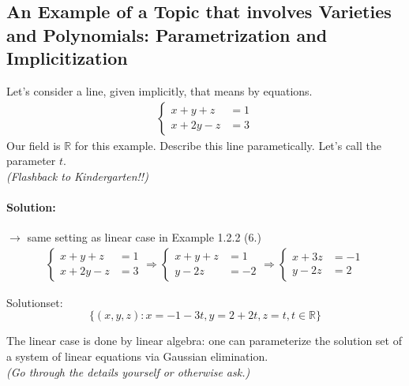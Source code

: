 \clearpage
\subsection{An Example of a Topic that involves Varieties and Polynomials: Parametrization and Implicitization} 

\begin{exercise}[title = Example 1.3.1 (Linear Case)]
  Let's consider a line, given implicitly, that means by equations. 
  \begin{align*}
  \left\{\begin{aligned}
    x + y + z & = 1 \\
    x + 2y -z & = 3
  \end{aligned}\right. 
\end{align*}
Our field is $\mathbb{R}$ for this example. Describe this line parametically. Let's call the parameter $t$.  \\ 

\hspace*{0.5cm}\textcolor{airforceblue}{\textit{(Flashback to Kindergarten!!)}} \\ 

\paragraph{Solution:} $\rightarrow$ same setting as linear case in Example 1.2.2 (6.)
\begin{align*}
  \left\{
  \begin{aligned}
    x + y + z & = 1 \\
    x + 2y -z & = 3
  \end{aligned} \right. \Longrightarrow
  \left\{
  \begin{aligned}
    x + y + z & = 1 \\
    y - 2z & = -2
  \end{aligned} \right. \Longrightarrow 
  \left\{
    \begin{aligned}
    x + 3z & = -1 \\
    y - 2z & = 2
    \end{aligned} \right.
\end{align*}  

\hspace*{0.5cm} Solutionset: \[\{(x,y,z): x = -1 - 3t, y = 2 + 2t, z = t, t \in \mathbb{R}\}\]
\end{exercise}

\begin{remark}[title = Remark 1.3.2]
  The linear case is done by linear algebra: one can parameterize the solution set of a system of linear equations via Gaussian elimination. \\

  \hspace*{0.5cm}\textcolor{airforceblue}{\textit{(Go through the details yourself or otherwise ask.)}} 
\end{remark}

